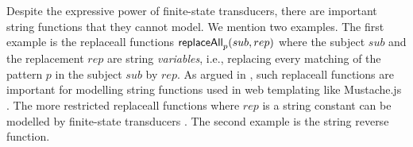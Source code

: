 
Despite the expressive power of finite-state transducers, there are important
string functions that they cannot model. We mention two examples. The first 
example is 
the 
replaceall functions $\mathsf{replaceAll}_p(sub,rep)$ where the subject $sub$ and the replacement 
$rep$ are string \emph{variables}, i.e., 
replacing every matching of the pattern $p$ in the subject $sub$ by $rep$.
As argued in \cite{CCHLW18},
such replaceall
functions are important for modelling string functions used in web 
templating like Mustache.js \cite{Mustache}. The more restricted replaceall
functions where $rep$ is a string constant can be modelled by finite-state  
transducers \cite{LB16}.
The second example is the string reverse function.



%
%


